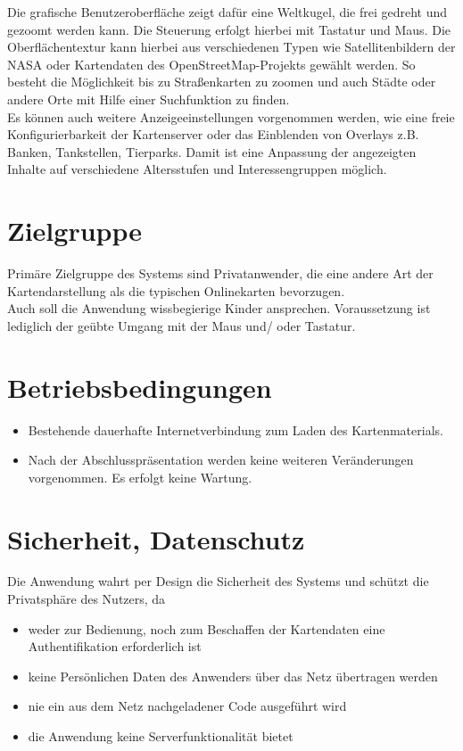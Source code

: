 \documentclass[10pt]{scrreprt}
\begin{document}
Die grafische Benutzeroberfläche zeigt dafür eine Weltkugel, die frei gedreht und gezoomt werden kann. Die Steuerung erfolgt hierbei mit Tastatur und Maus. Die Oberflächentextur kann hierbei aus verschiedenen Typen wie Satellitenbildern der NASA oder Kartendaten des OpenStreetMap-Projekts gewählt werden. 
So besteht die Möglichkeit bis zu Straßenkarten zu zoomen und auch Städte oder andere Orte mit Hilfe einer Suchfunktion zu finden. \\

Es können auch weitere Anzeigeeinstellungen vorgenommen werden, wie eine freie Konfigurierbarkeit der Kartenserver oder das Einblenden von Overlays z.B. Banken, Tankstellen, Tierparks.  
Damit ist eine Anpassung der angezeigten Inhalte auf verschiedene Altersstufen und Interessengruppen möglich.


\section{Zielgruppe}
Primäre Zielgruppe des Systems sind Privatanwender, die eine andere Art der Kartendarstellung als die typischen Onlinekarten bevorzugen. \\

Auch soll die Anwendung wissbegierige Kinder ansprechen. Voraussetzung ist lediglich der geübte Umgang mit der Maus und/ oder Tastatur.

\section{Betriebsbedingungen}
\begin{itemize}
\item Bestehende dauerhafte Internetverbindung zum Laden des Kartenmaterials.
\item Nach der Abschlusspräsentation werden keine weiteren 
Veränderungen vorgenommen. Es erfolgt keine Wartung.
\end{itemize} 

\section{Sicherheit, Datenschutz}
Die Anwendung wahrt per Design die Sicherheit des Systems und schützt die Privatsphäre des Nutzers, da
\begin{itemize}
\item weder zur Bedienung, noch zum Beschaffen der Kartendaten eine Authentifikation erforderlich ist
\item keine Persönlichen Daten des Anwenders über das Netz übertragen werden
\item nie ein aus dem Netz nachgeladener Code ausgeführt wird
\item die Anwendung keine Serverfunktionalität bietet
\end{itemize}
\end{document}
